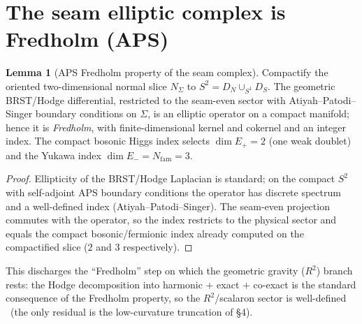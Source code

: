 \documentclass[11pt,a4paper]{article}
\newcommand{\Nfam}{N_{\mathrm{fam}}}
\theoremstyle{definition}
\newtheorem{lemma}{Lemma}
\begin{document}
\begin{center}
\end{center}

\section{The seam elliptic complex is Fredholm (APS)}
\begin{lemma}[APS Fredholm property of the seam complex]
\label{lem:aps}
Compactify the oriented two-dimensional normal slice $N_\Sigma$ to $S^2=D_N\cup_{S^1}D_S$.
The geometric BRST/Hodge differential, restricted to the seam-even sector with Atiyah--Patodi--Singer
boundary conditions on $\Sigma$, is an elliptic operator on a compact manifold; hence it is
\emph{Fredholm}, with finite-dimensional kernel and cokernel and an integer index. The compact bosonic
Higgs index selects $\dim E_+=2$ (one weak doublet) and the Yukawa index $\dim E_-=\Nfam=3$.
\end{lemma}
\begin{proof}
Ellipticity of the BRST/Hodge Laplacian is standard; on the compact $S^2$ with self-adjoint APS
boundary conditions the operator has discrete spectrum and a well-defined index (Atiyah--Patodi--Singer).
The seam-even projection commutes with the operator, so the index restricts to the physical sector and
equals the compact bosonic/fermionic index already computed on the compactified slice ($2$ and $3$ respectively).
\end{proof}

\noindent This discharges the ``Fredholm'' step on which the geometric gravity ($R^2$) branch rests:
the Hodge decomposition into harmonic $+$ exact $+$ co-exact is the standard consequence of the Fredholm
property, so the $R^2$/scalaron sector is well-defined \mE\ (the only residual is the low-curvature
truncation of \S4).
\end{document}
